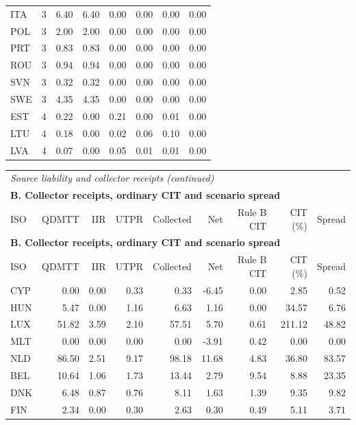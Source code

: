 {\begin{longtable}{@{}lrrrrrrr@{}}
ITA & 3 &  6.40 &  6.40 & 0.00 & 0.00 & 0.00 & 0.00 \\
POL & 3 &  2.00 &  2.00 & 0.00 & 0.00 & 0.00 & 0.00 \\
PRT & 3 &  0.83 &  0.83 & 0.00 & 0.00 & 0.00 & 0.00 \\
ROU & 3 &  0.94 &  0.94 & 0.00 & 0.00 & 0.00 & 0.00 \\
SVN & 3 &  0.32 &  0.32 & 0.00 & 0.00 & 0.00 & 0.00 \\
SWE & 3 &  4.35 &  4.35 & 0.00 & 0.00 & 0.00 & 0.00 \\
EST & 4 &  0.22 &  0.00 & 0.21 & 0.00 & 0.01 & 0.00 \\
LTU & 4 &  0.18 &  0.00 & 0.02 & 0.06 & 0.10 & 0.00 \\
LVA & 4 &  0.07 &  0.00 & 0.05 & 0.01 & 0.01 & 0.00 \\
\end{longtable}
\addtocounter{table}{-1}
\begin{longtable}{@{}lrrrrrrrr@{}}
\multicolumn{9}{l}{\textit{Source liability and collector receipts (continued)}} \\
\multicolumn{9}{l}{\textbf{B. Collector receipts, ordinary CIT and scenario spread}} \\
\toprule
ISO & QDMTT & IIR & UTPR & Collected & Net & Rule B CIT & CIT (\%) & Spread \\
\midrule
\endfirsthead
\multicolumn{9}{l}{\textbf{B. Collector receipts, ordinary CIT and scenario spread}} \\
\toprule
ISO & QDMTT & IIR & UTPR & Collected & Net & Rule B CIT & CIT (\%) & Spread \\
\midrule
\endhead
\midrule
\endfoot
\bottomrule
\endlastfoot
CYP &  0.00 &  0.00 &  0.33 &  0.33 & -6.45 &  0.00 &   2.85 &   0.52 \\
HUN &  5.47 &  0.00 &  1.16 &  6.63 &  1.16 &  0.00 &  34.57 &   6.76 \\
LUX & 51.82 &  3.59 &  2.10 & 57.51 &  5.70 &  0.61 & 211.12 &  48.82 \\
MLT &  0.00 &  0.00 &  0.00 &  0.00 & -3.91 &  0.42 &   0.00 &   0.00 \\
NLD & 86.50 &  2.51 &  9.17 & 98.18 & 11.68 &  4.83 &  36.80 &  83.57 \\
BEL & 10.64 &  1.06 &  1.73 & 13.44 &  2.79 &  9.54 &   8.88 &  23.35 \\
DNK &  6.48 &  0.87 &  0.76 &  8.11 &  1.63 &  1.39 &   9.35 &   9.82 \\
FIN &  2.34 &  0.00 &  0.30 &  2.63 &  0.30 &  0.49 &   5.11 &   3.71 \\

\end{longtable}}
